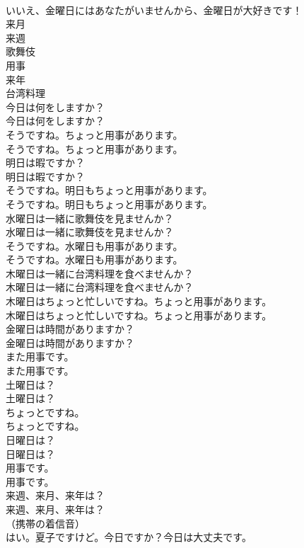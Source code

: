 \documentclass[8pt]{extreport}
\begin{document}
\begin{CJK}{UTF8}{min}
\\	いいえ、金曜日にはあなたがいませんから、金曜日が大好きです！ 
\\	来月
\\	来週
\\	歌舞伎
\\	用事
\\	来年
\\	台湾料理
\\	今日は何をしますか？	
\\	今日は何をしますか？ 
\\	そうですね。ちょっと用事があります。	
\\	そうですね。ちょっと用事があります。 
\\	明日は暇ですか？	
\\	明日は暇ですか？ 
\\	そうですね。明日もちょっと用事があります。	
\\	そうですね。明日もちょっと用事があります。 
\\	水曜日は一緒に歌舞伎を見ませんか？	
\\	水曜日は一緒に歌舞伎を見ませんか？ 
\\	そうですね。水曜日も用事があります。	
\\	そうですね。水曜日も用事があります。 
\\	木曜日は一緒に台湾料理を食べませんか？	
\\	木曜日は一緒に台湾料理を食べませんか？ 
\\	木曜日はちょっと忙しいですね。ちょっと用事があります。	
\\	木曜日はちょっと忙しいですね。ちょっと用事があります。 
\\	金曜日は時間がありますか？	
\\	金曜日は時間がありますか？ 
\\	また用事です。	
\\	また用事です。 
\\	土曜日は？	
\\	土曜日は？ 
\\	ちょっとですね。	
\\	ちょっとですね。 
\\	日曜日は？	
\\	日曜日は？ 
\\	用事です。	
\\	用事です。 
\\	来週、来月、来年は？	
\\	来週、来月、来年は？ 
\\	（携帯の着信音）	
\\	はい。夏子ですけど。今日ですか？今日は大丈夫です。	

\end{CJK}
\end{document}
